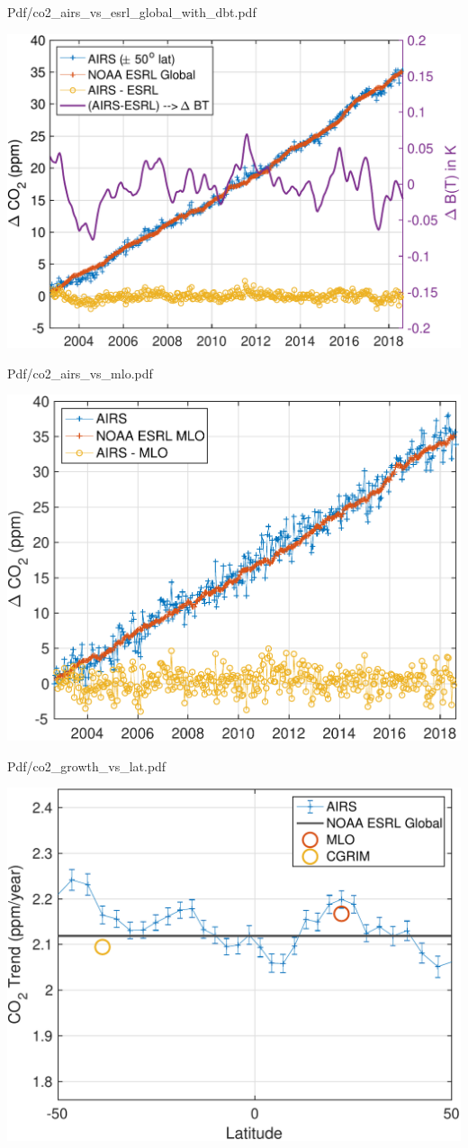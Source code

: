 \documentclass[10pt,t]{beamer}
\begin{document}
\begin{frame}[label={sec:org71fd442}]{Pdf/co2\_airs\_vs\_esrl\_global\_with\_dbt.pdf}
\begin{center}
\includegraphics[width=0.7\linewidth]{./Figs/Pdf/co2_airs_vs_esrl_global_with_dbt.pdf}
\end{center}
\end{frame}

\begin{frame}[label={sec:org8623bf5}]{Pdf/co2\_airs\_vs\_mlo.pdf}
\begin{center}
\includegraphics[width=0.7\linewidth]{./Figs/Pdf/co2_airs_vs_mlo.pdf}
\end{center}
\end{frame}

\begin{frame}[label={sec:org0b480aa}]{Pdf/co2\_growth\_vs\_lat.pdf}
\begin{center}
\includegraphics[width=0.7\linewidth]{./Figs/Pdf/co2_growth_vs_lat.pdf}
\end{center}
\end{frame}
\end{document}
